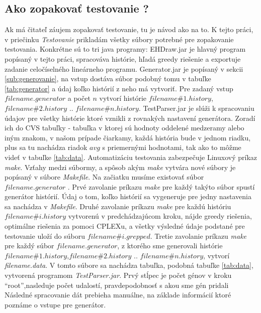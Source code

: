 \subsection{Ako zopakovať testovanie ?}
Ak má čitateľ záujem zopakovať testovanie, tu je návod ako na to.
K tejto práci, v priečinku \emph{Testovanie} prikladám všetky súbory potrebné pre zopakovanie testovania.
Konkrétne sú to tri java programy: EHDraw.jar je hlavný program popísaný v tejto práci, spracováva histórie, hľadá greedy riešenie a exportuje zadanie celočíselného lineárneho programu.
Generator.jar je popísaný v sekcii \ref{sub:generovanie}, na vstup dostáva súbor podobný tomu v tabuľke \ref{tab:generator} a údaj koľko histórií z neho má vytvoriť.
Pre zadaný vstup $filename.generator$ a počet $n$ vytvorí histórie $filename\#1.history$,$filename\#2.history$ .. $filename\#n.history$.
TestParser.jar je slúži k spracovaniu údajov pre všetky histórie ktoré vznikli z rovnakých nastavení generátora. Zoradí ich do CVS tabuľky - 
tabuľka v ktorej sú hodnoty oddelené medzeramy alebo iným znakom, v našom prípade čiarkamy,
každá história bude v jednom riadku, plus sa tu nachádza riadok $avg$ s priemernými hodnotami, tak ako to môžme videť v tabuľke \ref{tab:data}.
Automatizáciu testovania zabezpečuje Linuxový príkaz \emph{make}. Vzťahy medzi súbormy, a spôsob akým \emph{make} vytvára nové súbory je popísaný v súbore \emph{Makefile}.
Na začiatku musíme existovať súbor $filename.generator$ . Prvé zavolanie príkazu \emph{make} pre každý takýto súbor spustí generátor histórií.
Údaj o tom, koľko histórií sa vygeneruje pre jedny nastavenia sa nachádza v \emph{Makefile}.
Druhé zavolanie príkazu \emph{make} pre každú históriu $filename\#i.history$ vytvorenú v predchádzajúcom kroku, nájde greedy riešenia, optimálne riešenia za pomoci CPLEXu,
a všetky výsledné údaje podstané pre testovanie uloží do súboru $filename\#i.grepped$.
Tretie zavolanie príkazu \emph{make} pre každý súbor $filename.generator$, z ktorého sme generovali histórie $filename\#1.history$,$filename\#2.history$ .. $filename\#n.history$, vytvorí \emph{filename.data}.
V tomto súbore sa nachádza tabuľka, podobná tabuľke \ref{tab:data}, vytvorená programom \emph{TestParser.jar}.
Prvý stĺpec je počet génov v kroku ``root'',nasleduje počet udalostí, pravdepodobnosť s akou sme gén pridali 
Následné spracovanie dát prebieha manuálne, na základe informácií ktoré poznáme o vstupe pre generátor.
